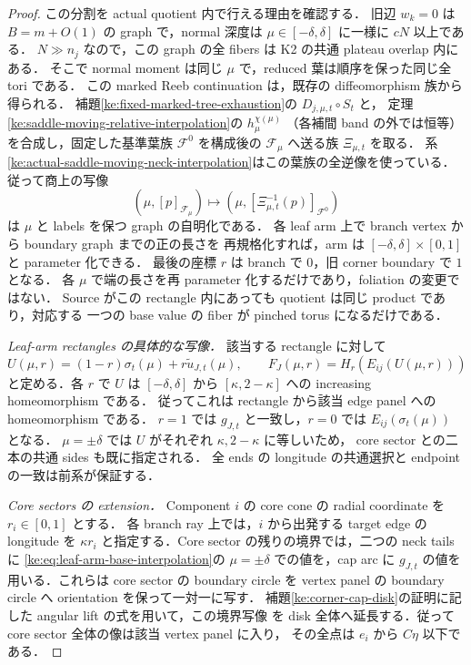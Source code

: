 \begin{proof}
この分割を actual quotient 内で行える理由を確認する．
旧辺 $w_k=0$ は $B=m+O(1)$ の graph で，normal 深度は
$\mu\in[-\delta,\delta]$ に一様に $cN$ 以上である．
$N\gg n_j$ なので，この graph の全 fibers は K2 の共通 plateau overlap 内にある．
そこで normal moment は同じ $\mu$ で，reduced 葉は順序を保った同じ全 tori である．
この marked Reeb continuation は，既存の diffeomorphism 族から得られる．
補題\ref{ke:fixed-marked-tree-exhaustion}の $D_{j,\mu,t}\circ S_t$ と，
定理\ref{ke:saddle-moving-relative-interpolation}の $h_\mu^{\chi(\mu)}$
（各補間 band の外では恒等）を合成し，固定した基準葉族
$\mathcal F^0$ を構成後の $\mathcal F_\mu$ へ送る族 $\Xi_{\mu,t}$ を取る．
系\ref{ke:actual-saddle-moving-neck-interpolation}はこの葉族の全逆像を使っている．
従って商上の写像
\[
 (\mu,[p]_{\mathcal F_\mu})
 \longmapsto(\mu,[\Xi_{\mu,t}^{-1}(p)]_{\mathcal F^0})
\]
は $\mu$ と labels を保つ graph の自明化である．
各 leaf arm 上で branch vertex から boundary graph までの正の長さを
再規格化すれば，arm は $[-\delta,\delta]\times[0,1]$ と parameter 化できる．
最後の座標 $r$ は branch で $0$，旧 corner boundary で $1$ となる．
各 $\mu$ で端の長さを再 parameter 化するだけであり，foliation の変更ではない．
Source がこの rectangle 内にあっても quotient は同じ product であり，対応する
一つの base value の fiber が pinched torus になるだけである．

\emph{Leaf-arm rectangles の具体的な写像．}
該当する rectangle に対して
\begin{equation}\label{ke:eq:leaf-arm-base-interpolation}
 U(\mu,r)=(1-r)\sigma_t(\mu)+r\widetilde u_{J,t}(\mu),\qquad
 F_J(\mu,r)=H_r(E_{ij}(U(\mu,r)))
\end{equation}
と定める．各 $r$ で $U$ は $[-\delta,\delta]$ から
$[\kappa,2-\kappa]$ への increasing homeomorphism である．
従ってこれは rectangle から該当 edge panel への homeomorphism である．
$r=1$ では $g_{J,t}$ と一致し，$r=0$ では $E_{ij}(\sigma_t(\mu))$ となる．
$\mu=\pm\delta$ では $U$ がそれぞれ $\kappa,2-\kappa$ に等しいため，
core sector との二本の共通 sides も既に指定される．
全 ends の longitude の共通選択と endpoint の一致は前系が保証する．

\emph{Core sectors の extension．}
Component $i$ の core cone の radial coordinate を $r_i\in[0,1]$ とする．
各 branch ray 上では，$i$ から出発する target edge の longitude を
$\kappa r_i$ と指定する．Core sector の残りの境界では，二つの neck tails に
\eqref{ke:eq:leaf-arm-base-interpolation}の $\mu=\pm\delta$ での値を，cap arc に
$g_{J,t}$ の値を用いる．これらは core sector の boundary circle を vertex panel
の boundary circle へ orientation を保って一対一に写す．
補題\ref{ke:corner-cap-disk}の証明に記した angular lift の式を用いて，この境界写像
を disk 全体へ延長する．従って core sector 全体の像は該当 vertex panel に入り，
その全点は $e_i$ から $C\eta$ 以下である．


\end{proof}
